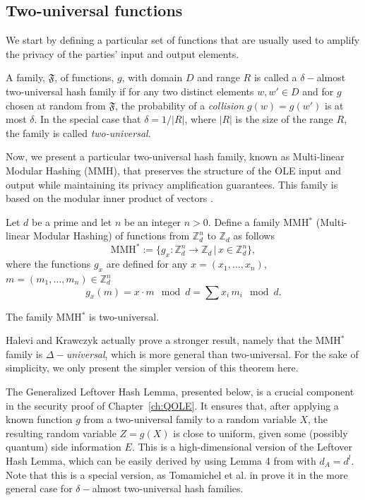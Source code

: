 \subsection{Two-universal functions}

We start by defining a particular set of functions that are usually used to amplify the privacy of the parties' input and output elements. 

\begin{definition}
A family, $\mathfrak{F}$, of functions, $g$, with domain $D$ and range $R$ is called a $\delta-$almost two-universal hash family if for any two distinct elements $w,w'\in D$ and for $g$ chosen at random from $\mathfrak{F}$, the probability of a \textit{collision} $g(w)=g(w')$ is at most $\delta$. In the special case that $\delta=1/|R|$, where $|R|$ is the size of the range $R$, the family is called \textit{two-universal}. 
\end{definition}

Now, we present a particular two-universal hash family, known as Multi-linear Modular Hashing (MMH), that preserves the structure of the OLE input and output while maintaining its privacy amplification guarantees. This family is based on the modular inner product of vectors \cite{HK97}.
\begin{definition}
Let $d$ be a prime and let $n$ be an integer $n>0$. Define a family MMH$^*$ (Multi-linear Modular Hashing) of functions from $\mathbb{Z}_d^n$ to $\mathbb{Z}_d$ as follows
$$\text{MMH}^*:= \{ g_x : \mathbb{Z}_d^n\rightarrow \mathbb{Z}_d \, | \, x\in \mathbb{Z}_d^n \},$$
where the functions $g_x$ are defined for any $x = (x_1,\ldots,x_n)$, $m = (m_1,\ldots, m_n) \in \mathbb{Z}_d^n$
$$g_x(m) = x\cdot m \mod d = \sum x_i\, m_i \mod d.$$
\label{def:MMH}
\end{definition}


\begin{theorem}
The family MMH$^*$ is two-universal.
\end{theorem}
Halevi and Krawczyk \cite{HK97} actually prove a stronger result, namely that the MMH$^*$ family is \textit{$\Delta-$universal}, which is more general than two-universal. For the sake of simplicity, we only present the simpler version of this theorem here.

The Generalized Leftover Hash Lemma, presented below, is a crucial component in the security proof of Chapter~\ref{ch:QOLE}. It ensures that, after applying a known function $g$ from a two-universal family to a random variable $X$, the resulting random variable $Z = g(X)$ is close to uniform, given some (possibly quantum) side information $E$. This is a high-dimensional version of the Leftover Hash Lemma, which can be easily derived by using Lemma 4 from \cite{TSSR11} with $d_A = d^l$. Note that this is a special version, as Tomamichel et al. in \cite{TSSR11} prove it in the more general case for $\delta-$almost two-universal hash families.

